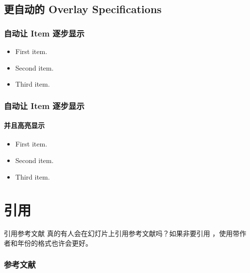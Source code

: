 \documentclass[aspectratio=169]{ctexbeamer}
\begin{document}
\subsection{更自动的 Overlay Specifications}

\begin{frame}
  \frametitle{自动让 Item 逐步显示}
  \begin{itemize}[<+->]
    \item First item.
    \item Second item.
    \item Third item.
  \end{itemize}
\end{frame}

\begin{frame}
  \frametitle{自动让 Item 逐步显示}
  \framesubtitle{并且高亮显示}
  \begin{itemize}[<+-| alert@+>]
    \item First item.
    \item Second item.
    \item Third item.
  \end{itemize}
\end{frame}

\section{引用}

\begin{frame}{引用参考文献}
  真的有人会在幻灯片上引用参考文献吗？如果非要引用 \cite{Knuth92}，使用带作者和年份的格式也许会更好。
\end{frame}

\begin{frame}[allowframebreaks]
  \frametitle{参考文献}
  \nocite{*}
  
  
\end{frame}
\end{document}
